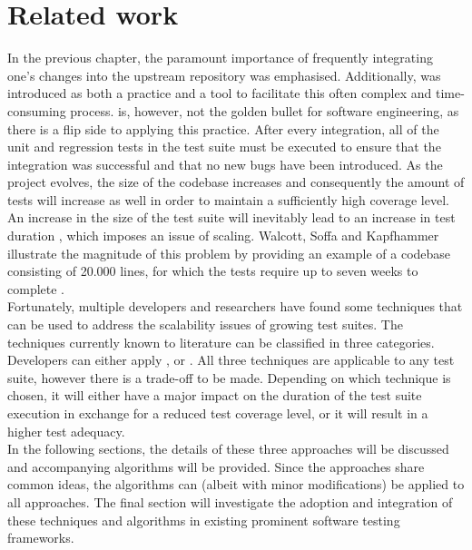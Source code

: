 
\chapter{Related work}
In the previous chapter, the paramount importance of frequently integrating one's changes into the upstream repository was emphasised. Additionally, \CI{} was introduced as both a practice and a tool to facilitate this often complex and time-consuming process. \CI{} is, however, not the golden bullet for software engineering, as there is a flip side to applying this practice. After every integration, all of the unit and regression tests in the test suite must be executed to ensure that the integration was successful and that no new bugs have been introduced. As the project evolves, the size of the codebase increases and consequently the amount of tests will increase as well in order to maintain a sufficiently high coverage level. An increase in the size of the test suite will inevitably lead to an increase in test duration \cite{evaluationoftestsuiteminimization}, which imposes an issue of scaling. Walcott, Soffa and Kapfhammer illustrate the magnitude of this problem by providing an example of a codebase consisting of 20.000 lines, for which the tests require up to seven weeks to complete \cite{10.1145/1146238.1146240}.\\

\noindent Fortunately, multiple developers and researchers have found some techniques that can be used to address the scalability issues of growing test suites. The techniques currently known to literature can be classified in three categories. Developers can either apply \emph{\tsm{}}, \emph{\tcs{}} or \emph{\tcp{}} \cite{evaluationoftestsuiteminimization}. All three techniques are applicable to any test suite, however there is a trade-off to be made. Depending on which technique is chosen, it will either have a major impact on the duration of the test suite execution in exchange for a reduced test coverage level, or it will result in a higher test adequacy.\\

\noindent In the following sections, the details of these three approaches will be discussed and accompanying algorithms will be provided. Since the approaches share common ideas, the algorithms can (albeit with minor modifications) be applied to all approaches. The final section will investigate the adoption and integration of these techniques and algorithms in existing prominent software testing frameworks.


\newpage

\newpage
